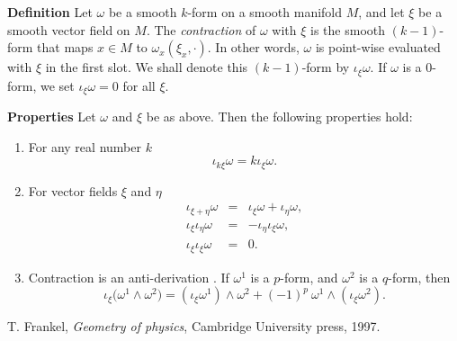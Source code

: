 \documentclass[12pt]{article}
\begin{document}
{\bf Definition} Let $\omega$ be a smooth $k$-form on a smooth manifold $M$,
and let $\xi$ be a smooth vector field on $M$. The \emph{contraction}
of $\omega$ with $\xi$ is the smooth $(k-1)$-form that maps $x\in M$ to
$\omega_x(\xi_x, \cdot)$.
In other words, $\omega$ is
point-wise evaluated with $\xi$ in the first slot.
We shall denote this $(k-1)$-form by  $\iota_\xi\omega$.
If $\omega$ is a $0$-form, we set $\iota_\xi \omega = 0$ for all $\xi$.

{\bf Properties} Let $\omega$ and $\xi$ be as above. Then
the following properties hold:
\begin{enumerate}
\item For any real number $k$
$$\iota_{k \xi} \omega = k\iota_\xi \omega.$$
\item For vector fields $\xi$ and $\eta$
\begin{eqnarray*}
\iota_{\xi+\eta} \omega &=& \iota_\xi \omega + \iota_\eta \omega, \\
\iota_{\xi} \iota_\eta \omega &=& -\iota_\eta \iota_\xi \omega, \\
\iota_{\xi} \iota_\xi \omega &=& 0.
\end{eqnarray*}
\item Contraction is an anti-derivation \cite{frankel}. If
$\omega^1$ is a $p$-form, and $\omega^2$ is a $q$-form, then
$$ \iota_\xi \big(\omega^1\wedge \omega^2\big) = (\iota_\xi \omega^1) \wedge \omega^2 + (-1)^p\ \omega^1\wedge (\iota_\xi \omega^2).$$
 \end{enumerate}

\begin{thebibliography}{9}
 T. Frankel,
        \emph{Geometry of physics},
        Cambridge University press,
        1997.
\end{thebibliography}
\end{document}
